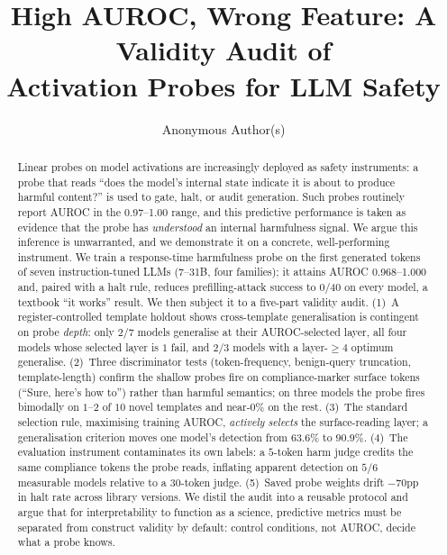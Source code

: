 \documentclass{article}
\title{High AUROC, Wrong Feature: A Validity Audit of\\ Activation Probes for LLM Safety}
\author{%
  Anonymous Author(s)%
}
\begin{document}
\maketitle

\begin{abstract}
Linear probes on model activations are increasingly deployed as safety instruments: a probe that reads ``does the model's internal state indicate it is about to produce harmful content?'' is used to gate, halt, or audit generation. Such probes routinely report AUROC in the 0.97--1.00 range, and this predictive performance is taken as evidence that the probe has \emph{understood} an internal harmfulness signal. We argue this inference is unwarranted, and we demonstrate it on a concrete, well-performing instrument. We train a response-time harmfulness probe on the first generated tokens of seven instruction-tuned LLMs (7--31B, four families); it attains AUROC 0.968--1.000 and, paired with a halt rule, reduces prefilling-attack success to 0/40 on every model, a textbook ``it works'' result. We then subject it to a five-part validity audit. (1)~A register-controlled template holdout shows cross-template generalisation is contingent on probe \emph{depth}: only $2/7$ models generalise at their AUROC-selected layer, all four models whose selected layer is $1$ fail, and $2/3$ models with a layer-$\geq 4$ optimum generalise. (2)~Three discriminator tests (token-frequency, benign-query truncation, template-length) confirm the shallow probes fire on compliance-marker surface tokens (``Sure, here's how to'') rather than harmful semantics; on three models the probe fires bimodally on $1$--$2$ of $10$ novel templates and near-$0\%$ on the rest. (3)~The standard selection rule, maximising training AUROC, \emph{actively selects} the surface-reading layer; a generalisation criterion moves one model's detection from $63.6\%$ to $90.9\%$. (4)~The evaluation instrument contaminates its own labels: a $5$-token harm judge credits the same compliance tokens the probe reads, inflating apparent detection on $5/6$ measurable models relative to a $30$-token judge. (5)~Saved probe weights drift $-70$pp in halt rate across library versions. We distil the audit into a reusable protocol and argue that for interpretability to function as a science, predictive metrics must be separated from construct validity by default: control conditions, not AUROC, decide what a probe knows.
\end{abstract}

\end{document}
